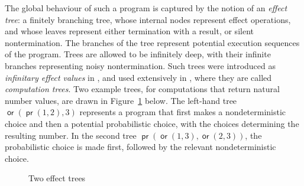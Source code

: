 \documentclass[a4paper,UKenglish]{lipics-v2018}
\newcommand{\prEff}{\operatorname{\textsf{pr}}}
\newcommand{\orEff}{\operatorname{\textsf{or}}}
\theoremstyle{plain}
\begin{document}
The global behaviour of such a program is captured by the notion of an \emph{effect tree}: a  finitely branching tree, whose 
internal nodes represent effect operations, and whose leaves represent either termination with a result, or silent nontermination. The branches of the tree represent potential execution sequences of the program. 
Trees are allowed to be infinitely deep, with their infinite branches representing noisy nontermination.
Such trees were introduced as \emph{infinitary effect values} in  \cite{plotkin2001adequacy}, and used extensively in \cite{gom}, where they are called
\emph{computation trees}. Two example trees, for computations that return natural number values, are drawn in
Figure~\ref{fig:exampletrees} below. The left-hand tree $\orEff (\prEff (1,2), 3)$ represents a program that first makes a nondeterministic choice and then a potential probabilistic choice, with the choices determining the resulting number. In the second tree $\prEff (\orEff (1,3), \orEff (2,3))$, the probabilistic choice is made first, followed by the relevant nondeterministic choice.

\begin{figure}[h]
\small
    \begin{center}
        \hspace*{8ex}
    \end{center}
    \caption{Two effect trees}
    \label{fig:exampletrees}
\end{figure}
\end{document}
